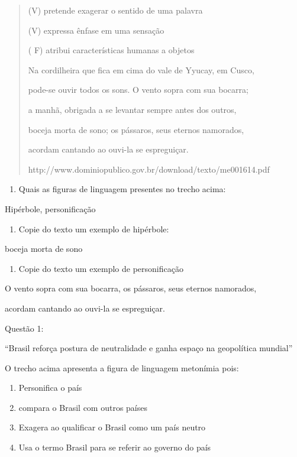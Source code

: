 {\begin{quote}
(V) pretende exagerar o sentido de uma palavra

(V) expressa ênfase em uma sensação

( F) atribui características humanas a objetos

Na cordilheira que fica em cima do vale de Yyucay, em Cusco,

pode-se ouvir todos os sons. O vento sopra com sua bocarra;

a manhã, obrigada a se levantar sempre antes dos outros,

boceja morta de sono; os pássaros, seus eternos namorados,

acordam cantando ao ouvi-la se espreguiçar.

http://www.dominiopublico.gov.br/download/texto/me001614.pdf
\end{quote}

\begin{enumerate}
\def\labelenumi{\arabic{enumi})}
\setcounter{enumi}{7}
\tightlist
\item
  Quais as figuras de linguagem presentes no trecho acima:
\end{enumerate}

Hipérbole, personificação

\begin{enumerate}
\def\labelenumi{\arabic{enumi})}
\setcounter{enumi}{8}
\tightlist
\item
  Copie do texto um exemplo de hipérbole:
\end{enumerate}

boceja morta de sono

\begin{enumerate}
\def\labelenumi{\arabic{enumi})}
\setcounter{enumi}{9}
\tightlist
\item
  Copie do texto um exemplo de personificação
\end{enumerate}

O vento sopra com sua bocarra, os pássaros, seus eternos namorados,

acordam cantando ao ouvi-la se espreguiçar.


Questão 1:

``Brasil reforça postura de neutralidade e ganha espaço na geopolítica
mundial''

O trecho acima apresenta a figura de linguagem metonímia pois:

\begin{enumerate}
\def\labelenumi{\alph{enumi})}
\item
  Personifica o país
\item
  compara o Brasil com outros países
\item
  Exagera ao qualificar o Brasil como um país neutro
\item
  Usa o termo Brasil para se referir ao governo do país
\end{enumerate}

}
